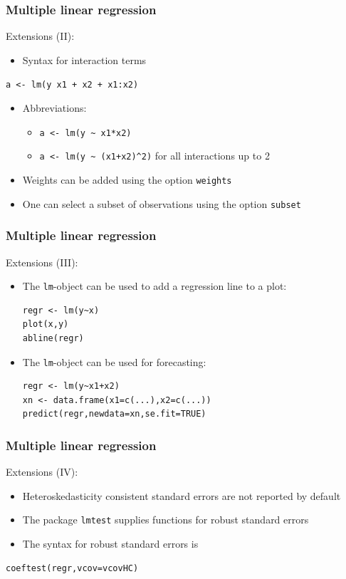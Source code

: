 \documentclass[xcolor={svgnames},10pt,
handout
]{beamer}
\begin{document}
\begin{frame}[fragile]
\frametitle{Multiple linear regression}
Extensions (II):
\begin{itemize}
\item Syntax for interaction terms
\end{itemize}
\begin{center}
\texttt{a <- lm(y  x1 + x2 + x1:x2)}
\end{center}
\begin{itemize}
\item Abbreviations:
\begin{itemize}
\item \lstinline|a <- lm(y ~ x1*x2)|
\item \lstinline|a <- lm(y ~ (x1+x2)^2)| for all interactions up to 2
\end{itemize}
\item Weights can be added using the option \texttt{weights}
\item One can select a subset of observations using the option \texttt{subset}
\end{itemize}
\end{frame}


\begin{frame}[fragile]
\frametitle{Multiple linear regression}
Extensions (III):
\begin{itemize}
\item The \texttt{lm}-object can be used to add a regression line to a plot:
\begin{lstlisting}
regr <- lm(y~x)
plot(x,y)
abline(regr)
\end{lstlisting}
\item The \texttt{lm}-object can be used for forecasting:
\begin{lstlisting}
regr <- lm(y~x1+x2)
xn <- data.frame(x1=c(...),x2=c(...))
predict(regr,newdata=xn,se.fit=TRUE)
\end{lstlisting}
\end{itemize}
\end{frame}


\begin{frame}[fragile]
\frametitle{Multiple linear regression}
Extensions (IV):
\begin{itemize}
\item Heteroskedasticity consistent standard errors are not reported by default
\item The package \texttt{lmtest} supplies functions for robust standard errors
\item The syntax for robust standard errors is
\end{itemize}
\begin{lstlisting}
coeftest(regr,vcov=vcovHC)
\end{lstlisting}
\end{frame}
\end{document}
